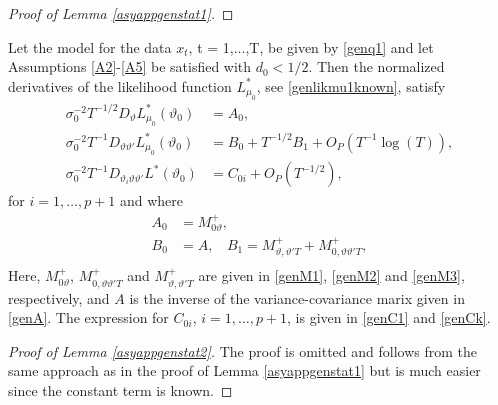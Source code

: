 {{\begin{proof}[Proof of Lemma \ref{asyappgenstat1}]
  

\end{proof}



















\begin{lemma} \label{asyappgenstat2}
Let the model for the data $x_t$, t = 1,$\ldots$,T, be given by \eqref{genq1} and let Assumptions \ref{A2}-\ref{A5} be satisfied with $d_0 < 1/2$. Then the normalized derivatives of the likelihood function $L_{\mu_0}^*$, see \eqref{genlikmu1known}, satisfy
\begin{align}
    \sigma_0^{-2} T^{-1/2} D_{\vartheta} L_{\mu_0}^*(\vartheta_0)  &= A_{0}, \\
    \sigma_0^{-2} T^{-1} D_{\vartheta \vartheta'} L_{\mu_0}^* (\vartheta_0)  &= B_{0} + T^{-1/2}  B_{1} + O_P(T^{-1} \log(T) ), \\
     \sigma_0^{-2} T^{-1} D_{\vartheta_i \vartheta \vartheta'} L^*(\vartheta_0)  &= C_{0i} + O_P(T^{-1/2}), 
\end{align}
for $i = 1,\ldots,p+1$ and where
\begin{align*}
A_{0} &= M_{0\vartheta}^{+},\\
B_{0} &= A, \ \ \ \ B_1 = M_{\vartheta,\vartheta' T}^{+} + M_{0,\vartheta \vartheta' T}^{+}, \\
\end{align*}
Here,
$M_{0\vartheta}^{+}$, $M_{0,\vartheta \vartheta' T}^{+}$ and $M_{\vartheta,\vartheta' T}^{+}$ are given in \eqref{genM1}, \eqref{genM2} and \eqref{genM3}, respectively,
and $A$ is the inverse of the variance-covariance marix given in \eqref{genA}. The expression for $C_{0i}$, $i = 1,\ldots,p+1$, is given in \eqref{genC1} and \eqref{genCk}. 
\end{lemma}

\begin{proof}[Proof of Lemma \ref{asyappgenstat2}]
The proof is omitted and follows from the same approach as in the proof of Lemma  \ref{asyappgenstat1} but is much easier since the constant term is known. 
\end{proof}


}}
